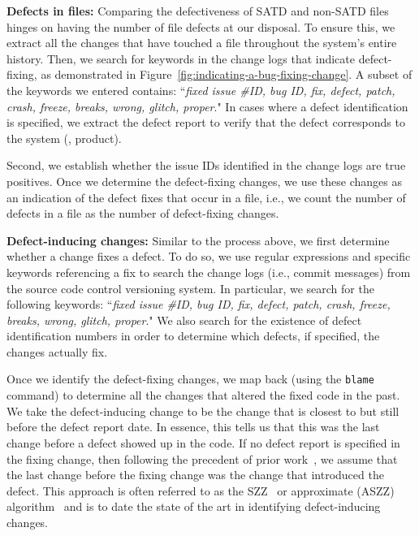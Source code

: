 \noindent\textbf{Defects in files:} Comparing the defectiveness of SATD and non-SATD files hinges on having the number of file defects at our disposal. To ensure this, we extract all the changes that have touched a file throughout the system's entire history. Then, we search for keywords in the change logs that indicate defect-fixing, as demonstrated in Figure~\ref{fig:indicating-a-bug-fixing-change}. A subset of the keywords we entered contains: ``\textit{fixed issue \#ID, bug ID, fix, defect, patch, crash, freeze, breaks, wrong, glitch, proper}." In cases where a defect identification is specified, we extract the defect report to verify that the defect corresponds to the system (\ie{}, product).

Second, we establish whether the issue IDs identified in the change logs are true positives. Once we determine the defect-fixing changes, we use these changes as an indication of the defect fixes that occur in a file, i.e., we count the number of defects in a file as the number of defect-fixing changes.


\noindent\textbf{Defect-inducing changes:} Similar to the process above, we first determine whether a change fixes a defect. To do so, we use regular expressions and specific keywords referencing a fix to search the change logs (i.e., commit messages) from the source code control versioning system. In particular, we search for the following keywords: ``\textit{fixed issue \#ID, bug ID, fix, defect,  patch, crash, freeze, breaks, wrong, glitch, proper}." We also search for the existence of defect identification numbers in order to determine which defects, if specified, the changes actually fix.

Once we identify the defect-fixing changes, we map back (using the \texttt{blame} command) to determine all the changes that altered the fixed code in the past. We take the defect-inducing change to be the change that is closest to but still before the defect report date. In essence, this tells us that this was the last change before a defect showed up in the code. If no defect report is specified in the fixing change, then following the precedent of prior work~\cite{Kamei-tse-2013}, we assume that the last change before the fixing change was the change that introduced the defect. This approach is often referred to as the SZZ~\cite{sliwerski-msr-2005} or approximate (ASZZ) algorithm~\cite{Kamei-tse-2013} and is to date the state of the art in identifying defect-inducing changes.



